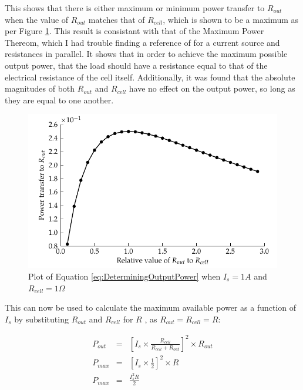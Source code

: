 This shows that there is either maximum or minimum power transfer to $R_{out}$
when the value of $R_{out}$ matches that of $R_{cell}$, which is shown to be a
maximum as per Figure \ref{fig:Plot-of-PowerThereom}.  This result is
consistant with that of the Maximum Power Thereom, which I had trouble finding
a reference of for a current source and resistances in parallel. It shows that
in order to achieve the maximum possible output power, that the load should
have a resistance equal to that of the electrical resistance of the cell
itself. Additionally, it was found that the absolute magnitudes of both
$R_{out}$ and $R_{cell}$ have no effect on the output power, so long as they
are equal to one another.

\begin{figure}
    \begin{centering}
        \includegraphics{content/pt1/01-PowerHarvesting/graphics/maximumPowerThereom}
    \end{centering}
    \caption{\label{fig:Plot-of-PowerThereom}Plot of Equation \ref{eq:DeterminingOutputPower} when $I_{s}=1A$ and $R_{cell}=1\Omega$}
\end{figure}


This can now be used to calculate the maximum available power as a function of
$I_{s}$ by substituting $R_{out}$ and $R_{cell}$ for $R$ , as
$R_{out}=R_{cell}=R$:

\begin{eqnarray} P_{out} & = &
    \left[I_{s}\times\frac{R_{cell}}{R_{cell}+R_{out}}\right]^{2}\times
    R_{out}\nonumber \\ P_{max} & = &
    \left[I_{s}\times\frac{1}{2}\right]^{2}\times R\nonumber \\ P_{max} & = &
    \frac{I_{s}^{2}R}{2}\label{eq:streamingCell_maxPower} \end{eqnarray}


